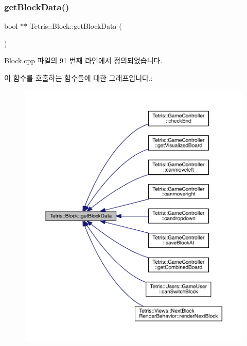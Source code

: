 \mbox{\label{class_tetris_1_1_block_a9bd2c3d6ccacff9a5f56f72336ba324f}} 
\subsubsection{\texorpdfstring{get\+Block\+Data()}{getBlockData()}\hspace{0.1cm}{\footnotesize\ttfamily [1/2]}}
{\footnotesize\ttfamily bool $\ast$$\ast$ Tetris\+::\+Block\+::get\+Block\+Data (\begin{DoxyParamCaption}{ }\end{DoxyParamCaption})}



Block.\+cpp 파일의 91 번째 라인에서 정의되었습니다.

이 함수를 호출하는 함수들에 대한 그래프입니다.\+:
\nopagebreak
\begin{figure}[H]
\begin{center}
\leavevmode
\includegraphics[width=350pt]{class_tetris_1_1_block_a9bd2c3d6ccacff9a5f56f72336ba324f_icgraph}
\end{center}
\end{figure}
\mbox{\label{class_tetris_1_1_block_a2e17230774c905e35aa9868986c49b09}} 
